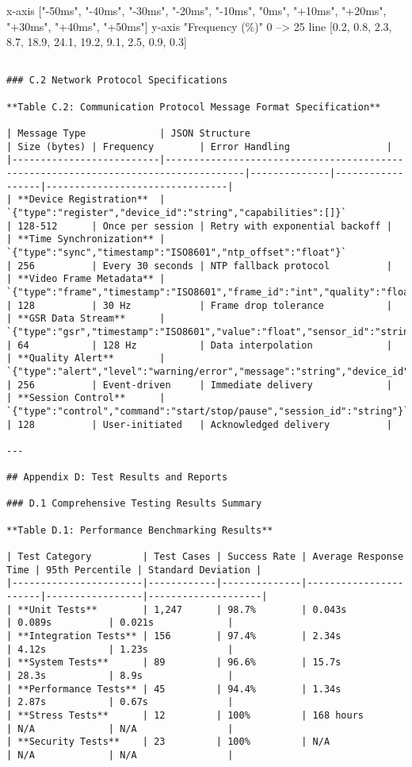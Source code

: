 \documentclass[11pt,a4paper]{report}
\begin{document}
    x-axis ["-50ms", "-40ms", "-30ms", "-20ms", "-10ms", "0ms", "+10ms", "+20ms", "+30ms", "+40ms", "+50ms"]
    y-axis "Frequency (\%)" 0 --> 25
    line [0.2, 0.8, 2.3, 8.7, 18.9, 24.1, 19.2, 9.1, 2.5, 0.9, 0.3]
\begin{verbatim}

### C.2 Network Protocol Specifications

**Table C.2: Communication Protocol Message Format Specification**

| Message Type             | JSON Structure                                                                     | Size (bytes) | Frequency        | Error Handling                 |
|--------------------------|------------------------------------------------------------------------------------|--------------|------------------|--------------------------------|
| **Device Registration**  | `{"type":"register","device_id":"string","capabilities":[]}`                       | 128-512      | Once per session | Retry with exponential backoff |
| **Time Synchronization** | `{"type":"sync","timestamp":"ISO8601","ntp_offset":"float"}`                       | 256          | Every 30 seconds | NTP fallback protocol          |
| **Video Frame Metadata** | `{"type":"frame","timestamp":"ISO8601","frame_id":"int","quality":"float"}`        | 128          | 30 Hz            | Frame drop tolerance           |
| **GSR Data Stream**      | `{"type":"gsr","timestamp":"ISO8601","value":"float","sensor_id":"string"}`        | 64           | 128 Hz           | Data interpolation             |
| **Quality Alert**        | `{"type":"alert","level":"warning/error","message":"string","device_id":"string"}` | 256          | Event-driven     | Immediate delivery             |
| **Session Control**      | `{"type":"control","command":"start/stop/pause","session_id":"string"}`            | 128          | User-initiated   | Acknowledged delivery          |

---

## Appendix D: Test Results and Reports

### D.1 Comprehensive Testing Results Summary

**Table D.1: Performance Benchmarking Results**

| Test Category         | Test Cases | Success Rate | Average Response Time | 95th Percentile | Standard Deviation |
|-----------------------|------------|--------------|-----------------------|-----------------|--------------------|
| **Unit Tests**        | 1,247      | 98.7%        | 0.043s                | 0.089s          | 0.021s             |
| **Integration Tests** | 156        | 97.4%        | 2.34s                 | 4.12s           | 1.23s              |
| **System Tests**      | 89         | 96.6%        | 15.7s                 | 28.3s           | 8.9s               |
| **Performance Tests** | 45         | 94.4%        | 1.34s                 | 2.87s           | 0.67s              |
| **Stress Tests**      | 12         | 100%         | 168 hours             | N/A             | N/A                |
| **Security Tests**    | 23         | 100%         | N/A                   | N/A             | N/A                |


\end{verbatim}
\end{document}
